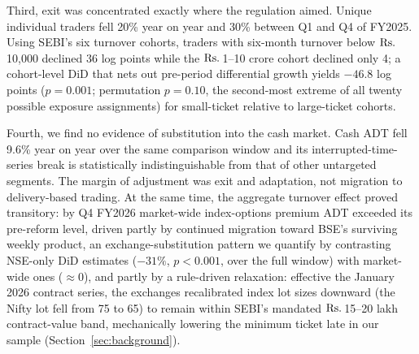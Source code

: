 \documentclass[12pt]{article}
\newcommand{\rupee}{\text{Rs.}\,}
\begin{document}
Third, exit was concentrated exactly where the regulation aimed. Unique
individual traders fell 20\% year on year and 30\% between Q1 and Q4 of
FY2025. Using SEBI's six turnover cohorts, traders with six-month turnover
below \(\text{\rupee}\)10{,}000 declined 36 log points while the
\(\text{\rupee}\)1--10 crore cohort declined only 4; a cohort-level DiD that
nets out pre-period differential growth yields $-46.8$ log points
($p=0.001$; permutation $p=0.10$, the second-most extreme of all twenty
possible exposure assignments) for small-ticket relative to large-ticket
cohorts.

Fourth, we find no evidence of substitution into the cash market. Cash ADT
fell 9.6\% year on year over the same comparison window and its
interrupted-time-series break is statistically indistinguishable from that of
other untargeted segments. The margin of adjustment was exit and adaptation,
not migration to delivery-based trading. At the same time, the aggregate
turnover effect proved transitory: by Q4 FY2026 market-wide index-options
premium ADT exceeded its pre-reform level, driven partly by continued
migration toward BSE's surviving weekly product, an exchange-substitution
pattern we quantify by contrasting NSE-only DiD estimates ($-31\%$,
$p<0.001$, over the full window) with market-wide ones ($\approx 0$), and
partly by a rule-driven relaxation: effective the January 2026 contract
series, the exchanges recalibrated index lot sizes downward (the Nifty lot
fell from 75 to 65) to remain within SEBI's mandated
\(\text{\rupee}\)15--20 lakh contract-value band, mechanically lowering the
minimum ticket late in our sample (Section~\ref{sec:background}).
\end{document}
